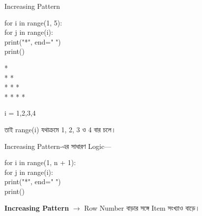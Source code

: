 

\begin{codeoutputbox}{Increasing Pattern}

\noindent
\begin{minipage}[t]{0.53\linewidth}
\codeheading

\begin{english}
\ttfamily
for i in range(1, 5):\\
\hspace*{4mm}for j in range(i):\\
\hspace*{8mm}print("*", end=" ")\\
\hspace*{4mm}print()
\end{english}

\end{minipage}
\hfill
\begin{minipage}[t]{0.43\linewidth}
\outputheading

\begin{english}
\ttfamily
*\\
* *\\
* * *\\
* * * *
\end{english}

\medskip

\textenglish{\ttfamily i = 1,2,3,4}

তাই
\textenglish{\ttfamily range(i)}
যথাক্রমে 1, 2, 3 ও 4 বার চলে।

\end{minipage}

\end{codeoutputbox}

\begin{rememberbox}

Increasing Pattern-এর সাধারণ Logic—

\begin{codebox}
\begin{english}
\ttfamily
for i in range(1, n + 1):\\
\hspace*{4mm}for j in range(i):\\
\hspace*{8mm}print("*", end=" ")\\
\hspace*{4mm}print()
\end{english}
\end{codebox}

\textbf{Increasing Pattern}
\(\longrightarrow\)
Row Number বাড়ার সঙ্গে Item সংখ্যাও বাড়ে।

\end{rememberbox}

